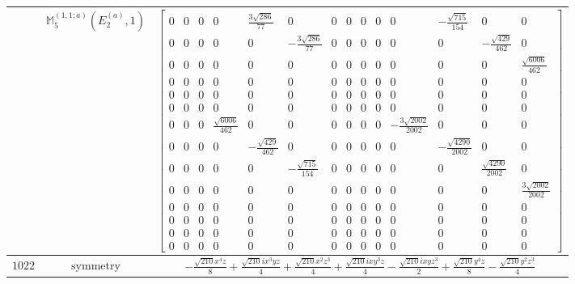 \documentclass[fleqn,8pt,landscape]{jsarticle}
\begin{document}
\begin{longtable}{ccc}
$  $ & $ \mathbb{M}_{5}^{(1,1;a)}(E_{2}^{(a)},1) $ & $ \begin{bmatrix} 0 & 0 & 0 & 0 & \frac{3 \sqrt{286}}{77} & 0 & 0 & 0 & 0 & 0 & 0 & - \frac{\sqrt{715}}{154} & 0 & 0 \\ 0 & 0 & 0 & 0 & 0 & - \frac{3 \sqrt{286}}{77} & 0 & 0 & 0 & 0 & 0 & 0 & - \frac{\sqrt{429}}{462} & 0 \\ 0 & 0 & 0 & 0 & 0 & 0 & 0 & 0 & 0 & 0 & 0 & 0 & 0 & \frac{\sqrt{6006}}{462} \\ 0 & 0 & 0 & 0 & 0 & 0 & 0 & 0 & 0 & 0 & 0 & 0 & 0 & 0 \\ 0 & 0 & 0 & 0 & 0 & 0 & 0 & 0 & 0 & 0 & 0 & 0 & 0 & 0 \\ 0 & 0 & 0 & 0 & 0 & 0 & 0 & 0 & 0 & 0 & 0 & 0 & 0 & 0 \\ 0 & 0 & 0 & \frac{\sqrt{6006}}{462} & 0 & 0 & 0 & 0 & 0 & 0 & - \frac{3 \sqrt{2002}}{2002} & 0 & 0 & 0 \\ 0 & 0 & 0 & 0 & - \frac{\sqrt{429}}{462} & 0 & 0 & 0 & 0 & 0 & 0 & - \frac{\sqrt{4290}}{2002} & 0 & 0 \\ 0 & 0 & 0 & 0 & 0 & - \frac{\sqrt{715}}{154} & 0 & 0 & 0 & 0 & 0 & 0 & \frac{\sqrt{4290}}{2002} & 0 \\ 0 & 0 & 0 & 0 & 0 & 0 & 0 & 0 & 0 & 0 & 0 & 0 & 0 & \frac{3 \sqrt{2002}}{2002} \\ 0 & 0 & 0 & 0 & 0 & 0 & 0 & 0 & 0 & 0 & 0 & 0 & 0 & 0 \\ 0 & 0 & 0 & 0 & 0 & 0 & 0 & 0 & 0 & 0 & 0 & 0 & 0 & 0 \\ 0 & 0 & 0 & 0 & 0 & 0 & 0 & 0 & 0 & 0 & 0 & 0 & 0 & 0 \\ 0 & 0 & 0 & 0 & 0 & 0 & 0 & 0 & 0 & 0 & 0 & 0 & 0 & 0 \end{bmatrix} $ \\ \hline
$ 1022 $ & $ \text{symmetry} $ & $ - \frac{\sqrt{210} x^{4} z}{8} + \frac{\sqrt{210} i x^{3} y z}{4} + \frac{\sqrt{210} x^{2} z^{3}}{4} + \frac{\sqrt{210} i x y^{3} z}{4} - \frac{\sqrt{210} i x y z^{3}}{2} + \frac{\sqrt{210} y^{4} z}{8} - \frac{\sqrt{210} y^{2} z^{3}}{4} $ \\

\end{longtable}
\end{document}
